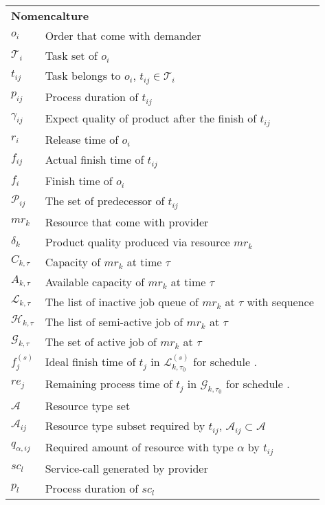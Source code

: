 \begin{table}[htbp]
  \scriptsize
\begin{tabularx}{\textwidth}{|lX|}
    \hline
    \multicolumn{2}{|l|}{\multirow{2}[0]{*}{\textbf{Nomencalture}}} \\
    \multicolumn{2}{|l|}{} \\
	$o_i$ & Order that come with demander \\
	$\mathcal{T}_i$ & Task set of $o_i$ \\
	$t_{ij}$ & Task belongs to $o_i$, $t_{ij}\in\mathcal{T}_i$ \\
	$p_{ij}$ & Process duration of $t_{ij}$\\
	$\gamma_{ij}$ & Expect quality of product after the finish of $t_{ij}$\\
	$r_i$ & Release time of $o_i$\\
	$f_{ij}$ & Actual finish time of $t_{ij}$ \\
	$f_{i}$ & Finish time of $o_i$\\
	$\mathcal{P}_{ij}$ & The set of predecessor of $t_{ij}$\\
	$mr_k$ & Resource that come with provider \\
	$\delta_k$ & Product quality produced via resource $mr_k$ \\
	$C_{k,\tau}$ & Capacity of $mr_k$ at time $\tau$\\
	$A_{k,\tau}$ & Available capacity of $mr_k$ at time $\tau$\\
	$\mathcal{L}_{k,\tau}$ & The list of inactive job queue of $mr_k$ at $\tau$ with sequence\\
	$\mathcal{H}_{k,\tau}$ & The list of semi-active job of $mr_k$ at $\tau$ \\
	$\mathcal{G}_{k,\tau}$ & The set of active job of $mr_k$ at $\tau$ \\ 
	$f^{(s)}_j$ & Ideal finish time of $t_j$ in $\mathcal{L}^{(s)}_{k,\tau_0}$ for schedule . \\
	$re_j$ & Remaining process time of $t_j$ in $\mathcal{G}_{k,\tau_0}$ for schedule . \\
	$\mathcal{A}$ & Resource type set \\
	$\mathcal{A}_{ij}$ & Resource type subset required by $t_{ij}$, $\mathcal{A}_{ij}\subset\mathcal{A}$\\
	$q_{\alpha,ij}$ & Required amount of resource with type $\alpha$ by $t_{ij}$\\
	$sc_l$ & Service-call generated by provider\\
	$p_l$ & Process duration of $sc_l$\\

\end{tabularx}
\end{table}
